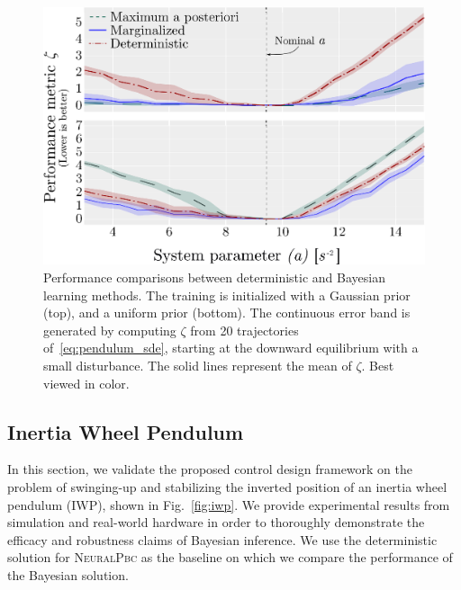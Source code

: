 \begin{figure}[tb]
    \centering
    \includegraphics[width=0.8\linewidth]{figures/H_combined.eps}
    \caption{
        Performance comparisons between deterministic and Bayesian learning
        methods. 
        The training is initialized with a Gaussian prior (top), and a
        uniform prior (bottom). 
        The continuous error band is generated by computing $\zeta$ from 20
        trajectories of~\eqref{eq:pendulum_sde}, starting at the downward
        equilibrium with a small disturbance. 
        The solid lines represent the mean of $\zeta$. 
        Best viewed in color.
    }
    \label{fig:bayes_compare}
\end{figure}
\subsection{Inertia Wheel Pendulum}
\label{subsec:iwp}
In this section, we validate the proposed control design framework on the
problem of swinging-up and stabilizing the inverted position of an inertia wheel
pendulum (IWP), shown in Fig.~\ref{fig:iwp}. We provide experimental results
from simulation and real-world hardware in order to thoroughly demonstrate the
efficacy and robustness claims of Bayesian inference. 
%
We use the deterministic solution for \textsc{NeuralPbc} as the baseline
on which we compare the performance of the Bayesian solution. 

